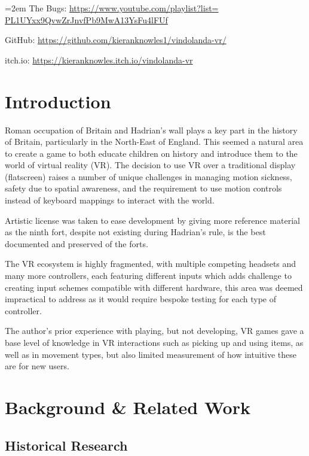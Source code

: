 \documentclass[sigconf]{acmart}
\begin{document}
\noindent \hangindent=2em The Bugs: \href{https://www.youtube.com/playlist?list=PL1UYxx9QvwZrJnvfPb9MwA13YsFu4lFUf}{
  https://www.youtube.com/playlist?list=\\PL1UYxx9QvwZrJnvfPb9MwA13YsFu4lFUf
}

\noindent GitHub: \url{https://github.com/kieranknowles1/vindolanda-vr/}

\noindent itch.io: \url{https://kieranknowles.itch.io/vindolanda-vr}

\section{Introduction}

Roman occupation of Britain and Hadrian's wall plays a key part in the history
of Britain, particularly in the North-East of England. This seemed a natural
area to create a game to both educate children on history and introduce
them to the world of virtual reality (VR). The decision to use VR over a
traditional display (flatscreen) raises a number of unique challenges in
managing motion sickness, safety due to spatial awareness, and the requirement
to use motion controls instead of keyboard mappings to interact with the world.

Artistic license was taken to ease development by giving more reference material
as the ninth fort, despite not existing during Hadrian's rule, is the best
documented and preserved of the forts.

The VR ecosystem is highly fragmented, with multiple competing headsets and many
more controllers, each featuring different inputs which adds challenge to
creating input schemes compatible with different hardware, this area was deemed
impractical to address as it would require bespoke testing for each type of
controller.

The author's prior experience with playing, but not developing, VR games gave a
base level of knowledge in VR interactions such as picking up and using items,
as well as in movement types, but also limited measurement of how intuitive
these are for new users.

\section{Background \& Related Work}

\subsection{Historical Research}
\end{document}
